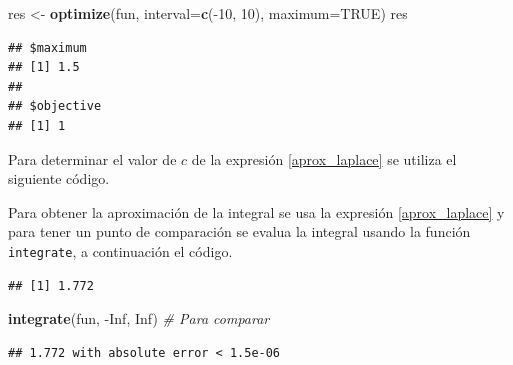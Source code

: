 \documentclass[10pt,]{krantz}
\makeatletter
\newenvironment{Shaded}{\begin{snugshade}}{\end{snugshade}}
\newcommand{\KeywordTok}[1]{\textcolor[rgb]{0.13,0.29,0.53}{\textbf{{#1}}}}
\newcommand{\DataTypeTok}[1]{\textcolor[rgb]{0.13,0.29,0.53}{{#1}}}
\newcommand{\DecValTok}[1]{\textcolor[rgb]{0.00,0.00,0.81}{{#1}}}
\newcommand{\StringTok}[1]{\textcolor[rgb]{0.31,0.60,0.02}{{#1}}}
\newcommand{\CommentTok}[1]{\textcolor[rgb]{0.56,0.35,0.01}{\textit{{#1}}}}
\newcommand{\OtherTok}[1]{\textcolor[rgb]{0.56,0.35,0.01}{{#1}}}
\newcommand{\NormalTok}[1]{{#1}}
\newenvironment{kframe}{%
\medskip{}
\setlength{\fboxsep}{.8em}
 \def\at@end@of@kframe{}%
 \ifinner\ifhmode%
  \def\at@end@of@kframe{\end{minipage}}%
  \begin{minipage}{\columnwidth}%
 \fi\fi%
 \def\FrameCommand##1{\hskip\@totalleftmargin \hskip-\fboxsep
 \colorbox{shadecolor}{##1}\hskip-\fboxsep
     \hskip-\linewidth \hskip-\@totalleftmargin \hskip\columnwidth}%
 \MakeFramed {\advance\hsize-\width
   \@totalleftmargin\z@ \linewidth\hsize
   \@setminipage}}%
 {\par\unskip\endMakeFramed%
 \at@end@of@kframe}
\renewenvironment{Shaded}{\begin{kframe}}{\end{kframe}}
\makeatother
\begin{document}
\begin{Shaded}
\begin{Highlighting}[]
\NormalTok{res <-}\StringTok{ }\KeywordTok{optimize}\NormalTok{(fun, }\DataTypeTok{interval=}\KeywordTok{c}\NormalTok{(-}\DecValTok{10}\NormalTok{, }\DecValTok{10}\NormalTok{), }\DataTypeTok{maximum=}\OtherTok{TRUE}\NormalTok{)}
\NormalTok{res}
\end{Highlighting}
\end{Shaded}

\begin{verbatim}
## $maximum
## [1] 1.5
## 
## $objective
## [1] 1
\end{verbatim}

Para determinar el valor de \(c\) de la expresión \ref{aprox_laplace} se
utiliza el siguiente código.

\begin{Shaded}
\end{Shaded}

Para obtener la aproximación de la integral se usa la expresión
\ref{aprox_laplace} y para tener un punto de comparación se evalua la
integral usando la función \texttt{integrate}, a continuación el código.

\begin{Shaded}
\end{Shaded}

\begin{verbatim}
## [1] 1.772
\end{verbatim}

\begin{Shaded}
\begin{Highlighting}[]
\KeywordTok{integrate}\NormalTok{(fun, -}\OtherTok{Inf}\NormalTok{, }\OtherTok{Inf}\NormalTok{)  }\CommentTok{# Para comparar}
\end{Highlighting}
\end{Shaded}

\begin{verbatim}
## 1.772 with absolute error < 1.5e-06
\end{verbatim}
\end{document}
